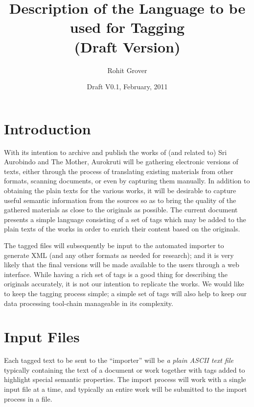\documentclass[11pt]{article}
\title{Description of the Language to be used for Tagging\\(Draft Version)}
\author{Rohit Grover}
\date{Draft V0.1, February, 2011}
\begin{document}
\maketitle

\newpage

\tableofcontents

\newpage

\section{Introduction}

\noindent With its intention to archive and publish the works of (and
related to) Sri Aurobindo and The Mother, Aurokruti will be gathering
electronic versions of texts, either through the process of
translating existing materials from other formats, scanning documents,
or even by capturing them manually. In addition to obtaining the plain
texts for the various works, it will be desirable to capture useful
semantic information from the sources so as to bring the quality of
the gathered materials as close to the originals as possible. The
current document presents a simple language consisting of a set of
tags which may be added to the plain texts of the works in order to
enrich their content based on the originals.

The tagged files will subsequently be input to the automated importer
to generate XML (and any other formats as needed for research); and it
is very likely that the final versions will be made available to the
users through a web interface. While having a rich set of tags is a
good thing for describing the originals accurately, it is not our
intention to replicate the works. We would like to keep the tagging
process simple; a simple set of tags will also help to keep our data
processing tool-chain manageable in its complexity.



\section{Input Files}

Each tagged text to be sent to the ``importer'' will be \emph{a plain
  ASCII text file} typically containing the text of a document or work
together with tags added to highlight special semantic properties.
The import process will work with a single input file at a time, and
typically an entire work will be submitted to the import process in a
file.
\end{document}
